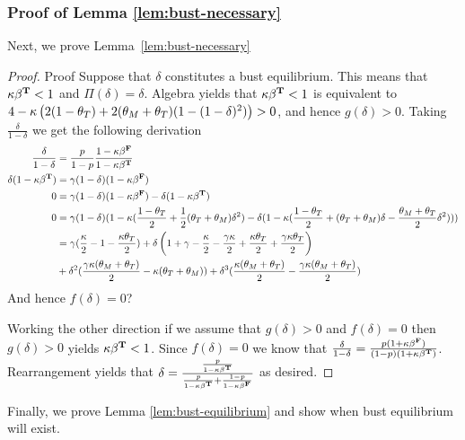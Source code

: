 \subsubsection{Proof of Lemma \ref{lem:bust-necessary}}
\noindent Next, we prove Lemma~\ref{lem:bust-necessary}

\begin{proof}{Proof}
    Suppose that $\delta$ constitutes a bust equilibrium. This means that $\kappa \beta^{\mathbf{T}} < 1$ and $\Pi(\delta) = \delta$.  Algebra yields that $\kappa \beta^{\mathbf{T}} < 1$ is equivalent to $4 - \kappa \left( 2 (1-\theta_T) + 2 (\theta_M + \theta_T) ( 1- (1-\delta)^2) \right) > 0 $, and hence $g(\delta)  >0$.
    Taking $\frac{\delta}{1-\delta}$ we get the following derivation
    \begin{align*}
        \frac{\delta}{1-\delta} &= \frac{p}{1-p}  \frac{1 - \kappa \beta^{\mathbf{F}}}{1 - \kappa \beta^{\mathbf{T}}} \\
        \delta (1- \kappa \beta^{\mathbf{T}}) &=  \gamma (1-\delta) (1 - \kappa \beta^{\mathbf{F}}) \\ 
        0 &=  \gamma (1-\delta) (1 - \kappa \beta^{\mathbf{F}}) - \delta (1- \kappa \beta^{\mathbf{T}})\\ 
        0 &=  \gamma (1-\delta) (1 -  \kappa ( \frac{1-\theta_T}{2} + \frac{1}{2}(\theta_T+\theta_M)\delta^2 ) - \delta (1- \kappa (\frac{1-\theta_T}{2} + (\theta_T+\theta_M)\delta - \frac{\theta_M + \theta_T}{2}\delta^2)  ))\\
        &=  \gamma ( \frac{\kappa}{2}-1 - \frac{\kappa \theta_T}{2})  + 
     \delta \left(1 + \gamma - \frac{\kappa}{2}  - \frac{\gamma \kappa}{2}  + \frac{\kappa \theta_T}{2}  + \frac{\gamma \kappa \theta_T}{2} \right)  \\
     &+ \delta^2 ( \frac{\gamma \kappa (\theta_M + \theta_T)}{2} - \kappa ( \theta_T + \theta_M)) + \delta^3 ( \frac{\kappa (\theta_M + \theta_T)}{2} - \frac{\gamma \kappa (\theta_M + \theta_T)}{2})
    \end{align*}
And hence $f(\delta) = 0$?

Working the other direction if we assume that $g(\delta)>0$ and $f(\delta)=0$ then $g(\delta) > 0$ yields $\kappa \beta^{\mathbf{T}} < 1$. Since $f(\delta) =0$ we know that $\frac{\delta}{1-\delta} = \frac{p (1+\kappa \beta^{\mathbf{F}})}{(1-p) (1+\kappa \beta^{\mathbf{T}})}$. Rearrangement yields that $\delta = \frac{ \frac{p}{1-\kappa \beta^{\mathbf{T}}}}{\frac{p}{1-\kappa \beta^{\mathbf{T}}} + \frac{1-p}{1-\kappa \beta^{\mathbf{F}}}} $ as desired.  
\end{proof}

Finally, we prove Lemma \ref{lem:bust-equilibrium} and show when bust equilibrium will exist. 



